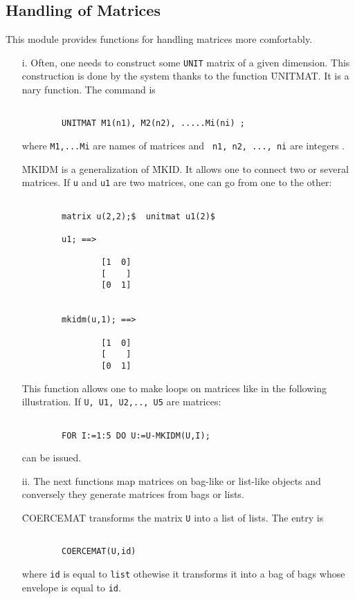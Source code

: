 \subsection{Handling of Matrices}
This module provides functions for handling matrices more comfortably.
\begin{itemize}
\item[i.]
Often, one needs to construct some {\tt UNIT} matrix of
a given dimension. This construction is done by the system thanks
to the function \f{UNITMAT}. It is a nary function. The command is
\begin{verbatim}

        UNITMAT M1(n1), M2(n2), .....Mi(ni) ;

\end{verbatim}
where \verb+M1,...Mi+ are names of matrices and
\verb+ n1, n2, ..., ni+ are integers .

\f{MKIDM} is a generalization of \f{MKID}. It allows one to connect
two or several matrices. If \verb+u+ and \verb+u1+ are two matrices,
one can go from one to the other:
\begin{verbatim}

        matrix u(2,2);$  unitmat u1(2)$

        u1; ==>

                [1  0]
                [    ]
                [0  1]


        mkidm(u,1); ==>

                [1  0]
                [    ]
                [0  1]

\end{verbatim}
This function allows one to make loops on matrices like in the following
illustration. If \verb+U, U1, U2,.., U5+ are matrices:
\begin{verbatim}

        FOR I:=1:5 DO U:=U-MKIDM(U,I);

\end{verbatim}
can be issued.
\item[ii.]
The next functions map matrices on bag-like or list-like objects
and conversely  they generate matrices from bags or lists.

\f{COERCEMAT} transforms the matrix \verb+U+ into a list of lists.
The entry is
\begin{verbatim}

        COERCEMAT(U,id)

\end{verbatim}
where \verb+id+ is equal to \verb+list+ othewise it transforms it into
a bag of bags whose envelope is equal to \verb+id+.


\end{itemize}
